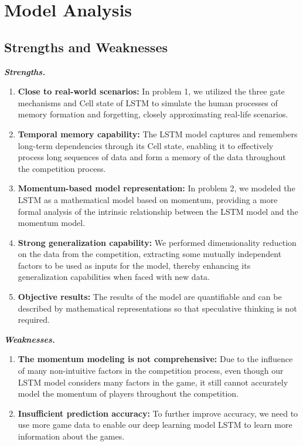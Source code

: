 \section{Model Analysis}
\subsection{Strengths and Weaknesses}

\textit{\textbf{Strengths.}}
\begin{enumerate}
    \item \textbf{Close to real-world scenarios: }In problem 1, we utilized the three gate mechanisms and Cell state of LSTM to simulate the human processes of memory formation and forgetting, closely approximating real-life scenarios.

    \item \textbf{Temporal memory capability: }The LSTM model captures and remembers long-term dependencies through its Cell state, enabling it to effectively process long sequences of data and form a memory of the data throughout the competition process.
    \item \textbf{Momentum-based model representation: }In problem 2, we modeled the LSTM as a mathematical model based on momentum, providing a more formal analysis of the intrinsic relationship between the LSTM model and the momentum model.

    \item \textbf{Strong generalization capability: }We performed dimensionality reduction on the data from the competition, extracting some mutually independent factors to be used as inputs for the model, thereby enhancing its generalization capabilities when faced with new data.
    \item \textbf{Objective results: }The results of the model are quantifiable and can be described by mathematical representations so that speculative thinking is not required.
\end{enumerate}

\textit{\textbf{Weaknesses.}}
\begin{enumerate}
    \item \textbf{The momentum modeling is not comprehensive: }Due to the influence of many non-intuitive factors in the competition process, even though our LSTM model considers many factors in the game, it still cannot accurately model the momentum of players throughout the competition.
    \item \textbf{Insufficient prediction accuracy: }To further improve accuracy, we need to use more game data to enable our deep learning model LSTM to learn more information about the games.

\end{enumerate}


